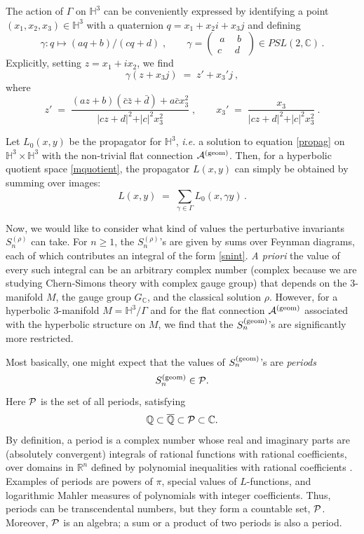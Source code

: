 \documentclass[hyper]{JHEP3}
\def\CA {{\cal A}}
\def\CP {{\cal P}}
\newcommand{\C}{{\mathbb{C}}}
\newcommand{\IH}{{\mathbb{H}}}
\newcommand\be{\begin{equation}}
\newcommand\ee{\end{equation}}
\def\={\;=\;}
\begin{document}
The action of $\Gamma$ on $\IH^3$ can be conveniently expressed by
identifying a point $(x_1, x_2, x_3) \in \IH^3$ with a quaternion
$q = x_1 + x_2 i + x_3 j$ and defining
\be
\gamma : q \mapsto (aq + b)/(cq + d)\;, \qquad
\gamma = 
\begin{pmatrix}  ~a~ & ~b~ \\ c & d  \end{pmatrix}
\in PSL (2,\C)\,.
\ee
Explicitly, setting $z = x_1 + i x_2$, we find
\be
\gamma (z + x_3 j) \= z' + x_3' j~,
\ee
where
\be
z' \= \frac{(az + b)(\bar{c} \bar{z} + \bar{d})
+ a\bar{c} x_3^2}{\vert cz + d \vert^2 + \vert c \vert^2 x_3^2}
\;, \qquad
x_3' \= \frac{x_3}{\vert cz + d \vert^2 + \vert c \vert^2 x_3^2}~.
\ee

Let $L_0 (x,y)$ be the propagator for $\IH^3$,
{\it i.e.} a solution to equation \eqref{propag} on $\IH^3 \times \IH^3$
with the non-trivial flat connection $\CA^{({\rm geom})}$.
Then, for a hyperbolic quotient space \eqref{mquotient}, the propagator $L(x,y)$
can simply be obtained by summing over images:
\be
L (x,y) \= \sum_{\gamma \in \Gamma} L_0 (x , \gamma y)\,.
\label{lll}
\ee

Now, we would like to consider what kind of values the perturbative invariants
$S_n^{(\rho)}$ can take. For $n \ge 1$, the $S_n^{(\rho)}$'s are given by sums over
Feynman diagrams, each of which contributes an integral of the form \eqref{snint}.
{\it A priori} the value of every such integral can be an arbitrary complex number
(complex because we are studying Chern-Simons theory with complex gauge group)
that depends on the 3-manifold $M$, the gauge group $G_{\C}$, and the classical
solution $\rho$.
However, for a hyperbolic 3-manifold $M = \IH^3 / \Gamma$
and for the flat connection $\CA^{({\rm geom})}$ associated with the hyperbolic structure on $M$,
we find that the $S_n^{({\rm geom})}$'s are significantly more restricted.

Most basically, one might expect that the values of $S_n^{({\rm geom})}$'s are {\it periods} \cite{kontsevich-2001}
\be
S_n^{({\rm geom})} \in \CP.
\ee
Here $\CP$ is the set of all periods, satisfying
\be
\mathbb{Q} \subset \overline{\mathbb{Q}} \subset \CP \subset \C.
\label{qqpc}
\ee
By definition, a period is a complex number whose real and imaginary parts
are (absolutely convergent) integrals of rational functions with rational coefficients,
over domains in $\mathbb{R}^n$ defined by polynomial inequalities with rational
coefficients \cite{kontsevich-2001}.
Examples of periods are powers of $\pi$, special values of $L$-functions,
and logarithmic Mahler measures of polynomials with integer coefficients.
Thus, periods can be transcendental numbers, but they form a countable set, $\CP$.
Moreover, $\CP$ is an algebra; a sum or a product of two periods is also a period.
\end{document}
